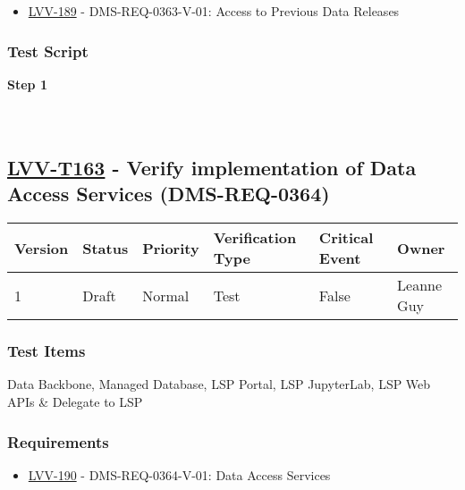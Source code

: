 \begin{itemize}
\tightlist
\item
  \href{https://jira.lsstcorp.org/browse/LVV-189}{LVV-189} -
  DMS-REQ-0363-V-01: Access to Previous Data Releases
\end{itemize}

\hypertarget{test-script-62}{%
\subsubsection{Test Script}\label{test-script-62}}

\textbf{Step 1}\\
~\\
~\\

\hypertarget{lvv-t163---verify-implementation-of-data-access-services-dms-req-0364}{%
\subsection{\texorpdfstring{\href{https://jira.lsstcorp.org/secure/Tests.jspa\#/testCase/LVV-T163}{LVV-T163}
- Verify implementation of Data Access Services
(DMS-REQ-0364)}{LVV-T163 - Verify implementation of Data Access Services (DMS-REQ-0364)}}\label{lvv-t163---verify-implementation-of-data-access-services-dms-req-0364}}

\begin{longtable}[]{@{}llllll@{}}
\toprule
Version & Status & Priority & Verification Type & Critical Event &
Owner\tabularnewline
\midrule
\endhead
1 & Draft & Normal & Test & False & Leanne Guy\tabularnewline
\bottomrule
\end{longtable}

\hypertarget{test-items-63}{%
\subsubsection{Test Items}\label{test-items-63}}

Data Backbone, Managed Database, LSP Portal, LSP JupyterLab, LSP Web
APIs \& Delegate to LSP

\hypertarget{requirements-63}{%
\subsubsection{Requirements}\label{requirements-63}}

\begin{itemize}
\tightlist
\item
  \href{https://jira.lsstcorp.org/browse/LVV-190}{LVV-190} -
  DMS-REQ-0364-V-01: Data Access Services
\end{itemize}

